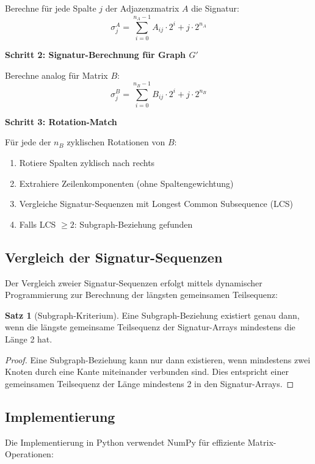 ﻿\documentclass[a4paper,12pt]{article}
\theoremstyle{definition}
\newtheorem{satz}{Satz}
\begin{document}
Berechne für jede Spalte $j$ der Adjazenzmatrix $A$ die Signatur:
\[
\sigma_j^A = \sum_{i=0}^{n_A-1} A_{ij} \cdot 2^i + j \cdot 2^{n_A}
\]

\textbf{Schritt 2: Signatur-Berechnung für Graph $G'$}

Berechne analog für Matrix $B$:
\[
\sigma_j^B = \sum_{i=0}^{n_B-1} B_{ij} \cdot 2^i + j \cdot 2^{n_B}
\]

\textbf{Schritt 3: Rotation-Match}

Für jede der $n_B$ zyklischen Rotationen von $B$:
\begin{enumerate}
	\item Rotiere Spalten zyklisch nach rechts
	\item Extrahiere Zeilenkomponenten (ohne Spaltengewichtung)
	\item Vergleiche Signatur-Sequenzen mit Longest Common Subsequence (LCS)
	\item Falls LCS $\geq 2$: Subgraph-Beziehung gefunden
\end{enumerate}

\subsection{Vergleich der Signatur-Sequenzen}

Der Vergleich zweier Signatur-Sequenzen erfolgt mittels dynamischer Programmierung zur Berechnung der längsten gemeinsamen Teilsequenz:

\begin{satz}[Subgraph-Kriterium]
	Eine Subgraph-Beziehung existiert genau dann, wenn die längste gemeinsame Teilsequenz der Signatur-Arrays mindestens die Länge 2 hat.
\end{satz}

\begin{proof}
	Eine Subgraph-Beziehung kann nur dann existieren, wenn mindestens zwei Knoten durch eine Kante miteinander verbunden sind. Dies entspricht einer gemeinsamen Teilsequenz der Länge mindestens 2 in den Signatur-Arrays.
\end{proof}

\subsection{Implementierung}

Die Implementierung in Python verwendet NumPy für effiziente Matrix-Operationen:
\end{document}

